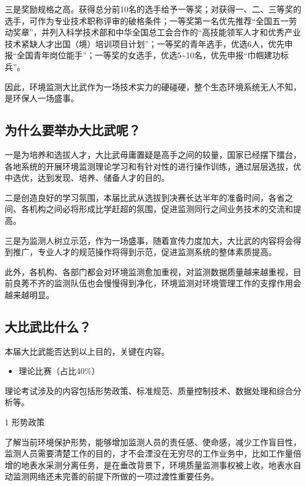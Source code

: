 \documentclass[
]{book}
\providecommand{\tightlist}{%
  \setlength{\itemsep}{0pt}\setlength{\parskip}{0pt}}
\begin{document}
三是奖励规格之高。获得总分前10名的选手给予一等奖；对获得一、二、三等奖的选手，可作为专业技术职称评审的破格条件；一等奖第一名优先推荐``全国五一劳动奖章''，并列入科学技术部和中华全国总工会合作的``高技能领军人才和优秀产业技术紧缺人才出国（境）培训项目计划''；一等奖的青年选手，优选6人，优先申报``全国青年岗位能手''；一等奖的女选手，优选5\textasciitilde10名，优先申报``巾帼建功标兵''。

因此，环境监测大比武作为一场技术实力的硬碰硬，整个生态环境系统无人不知，是环保人一场盛事。

\hypertarget{ux4e3aux4ec0ux4e48ux8981ux4e3eux529eux5927ux6bd4ux6b66ux5462}{%
\subsection{为什么要举办大比武呢？}\label{ux4e3aux4ec0ux4e48ux8981ux4e3eux529eux5927ux6bd4ux6b66ux5462}}

一是为培养和选拔人才，大比武毋庸置疑是高手之间的较量，国家已经摆下擂台，各地系统的开展环境监测理论学习和有针对性的进行操作训练，通过层层选拔，优中选优，达到发现、培养、储备人才的目的。

二是创造良好的学习氛围，本届比武从选拔到决赛长达半年的准备时间，各省之间、各机构之间必将形成比学赶超的氛围，促进监测同行之间业务技术的交流和提高。

三是为监测人树立示范，作为一场盛事，随着宣传力度加大，大比武的内容将会得到推广，专业人才的规范操作将得到示范，促进监测系统的整体素质提高。

此外，各机构、各部门都会对环境监测愈加重视，对监测数据质量越来越重视，目前良莠不齐的监测队伍也会慢慢得到净化，环境监测对环境管理工作的支撑作用会越来越明显。

\hypertarget{ux5927ux6bd4ux6b66ux6bd4ux4ec0ux4e48}{%
\subsection{大比武比什么？}\label{ux5927ux6bd4ux6b66ux6bd4ux4ec0ux4e48}}

本届大比武能否达到以上目的，关键在内容。

\begin{itemize}
\tightlist
\item
  理论比赛（占比40\%）
\end{itemize}

理论考试涉及的内容包括形势政策、标准规范、质量控制技术、数据处理和综合分析等。

1 形势政策

了解当前环境保护形势，能够增加监测人员的责任感、使命感，减少工作盲目性，监测人员需要清楚工作的目的，才不会湮没在无穷尽的工作业务中，比如工作量倍增的地表水采测分离任务，是在垂改背景下，环境质量监测事权被上收，地表水自动监测网络还未完善的前提下所做的一项过渡性重要任务。
\end{document}
